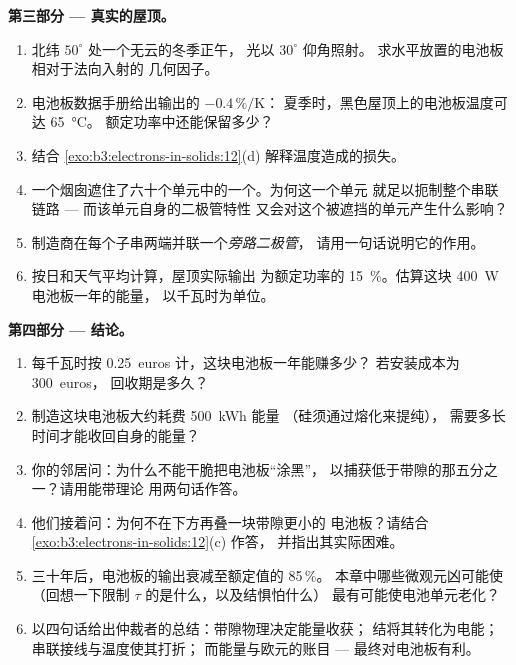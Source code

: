 \begin{problem}
\medskip\noindent\textbf{第三部分 --- 真实的屋顶。}

\begin{enumerate}[resume]
  \item 北纬 $50^\circ$ 处一个无云的冬季正午，
        光以 $30^\circ$ 仰角照射。
        求水平放置的电池板相对于法向入射的
        几何因子。
  \item 电池板数据手册给出输出的 $-0.4\,\%/\text{K}$：
        夏季时，黑色屋顶上的电池板温度可达 \qty{65}{\celsius}。
        额定功率中还能保留多少？
  \item 结合
        \cref{exo:b3:electrons-in-solids:12}(d) 解释温度造成的损失。
  \item 一个烟囱遮住了六十个单元中的一个。为何这一个单元
        就足以扼制整个串联链路 --- 而该单元自身的二极管特性
        又会对这个被遮挡的单元产生什么影响？
  \item 制造商在每个子串两端并联一个\emph{旁路二极管}，
        请用一句话说明它的作用。
  \item 按日和天气平均计算，屋顶实际输出
        为额定功率的 \qty{15}{\percent}。估算这块 \qty{400}{W} 电池板一年的能量，
        以千瓦时为单位。
\end{enumerate}

\medskip\noindent\textbf{第四部分 --- 结论。}

\begin{enumerate}[resume]
  \item 每千瓦时按 \qty{0.25}{euros} 计，这块电池板一年能赚多少？
        若安装成本为 \qty{300}{euros}，
        回收期是多久？
  \item 制造这块电池板大约耗费 \qty{500}{kWh} 能量
        （硅须通过熔化来提纯），
        需要多长时间才能收回自身的能量？
  \item 你的邻居问：为什么不能干脆把电池板“涂黑”，
        以捕获低于带隙的那五分之一？请用能带理论
        用两句话作答。
  \item 他们接着问：为何不在下方再叠一块带隙更小的
        电池板？请结合
        \cref{exo:b3:electrons-in-solids:12}(c) 作答，
        并指出其实际困难。
  \item 三十年后，电池板的输出衰减至额定值的 85\,\%。
        本章中哪些微观元凶可能使
        （回想一下限制 $\tau$ 的是什么，以及结惧怕什么）
        最有可能使电池单元老化？
  \item 以四句话给出仲裁者的总结：带隙物理决定能量收获；
        结将其转化为电能；串联接线与温度使其打折；
        而能量与欧元的账目 --- 
        最终对电池板有利。
\end{enumerate}
\end{problem}
